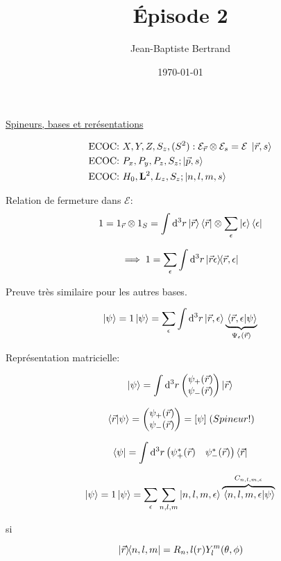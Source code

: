 \documentclass{article}
\title{Épisode 2}
\author{Jean-Baptiste Bertrand}
\date{\today}
\begin{document}
\maketitle

\underline{Spineurs, bases et rerésentations}

\begin{align}
	&\text{ECOC: } X, Y, Z, S_z, (S^2): \mathcal{E}_{\vec r}\otimes \mathcal{E}_s=\mathcal{E}\; \ket{\vec r, s}\\
	&\text{ECOC: } P_x, P_y, P_z, S_z; \ket{\vec p, s}\\
	&\text{ECOC: } H_0, \vb L^2, L_z, S_z ; \ket{n,l,m,s}
\end{align}

Relation de fermeture dans $\mathcal{E}:$ $$1 = 1_{\vec r} \otimes 1_S = \int \dd^3 r \ket{\vec r}\bra{\vec r} \otimes \sum_\epsilon \ket{\epsilon}\bra{\epsilon}$$

$$\implies 1 = \sum_\epsilon\int\dd^3r \ketbra*{\vec r\epsilon}{\vec r, \epsilon}$$

Preuve très similaire pour les autres bases.

$$\ket\psi = 1 \ket \psi = \sum_\epsilon \int \dd^3r \ket{\vec r, \epsilon} \underbrace{\braket*{\vec r, \epsilon}{\psi}}_{\Psi_\epsilon(\vec r)}$$

Représentation matricielle:

$$
	\ket\psi = \int \dd^3 r \begin{pmatrix}
		\psi_+(\vec r)\\
		\psi_-(\vec r)
	\end{pmatrix}\ket{\vec r}
$$

$$\braket*{\vec r}{\psi} = \begin{pmatrix}
	\psi_+(\vec r)\\
	\psi_-(\vec r) 
\end{pmatrix} = [\psi] \; \text(Spineur!)$$ 

$$
	\bra\psi = \int \dd^3 r \begin{pmatrix}
		\psi^*_+(\vec r) &
		\psi^*_-(\vec r)
	\end{pmatrix}\bra{\vec r}
$$


\begin{equation}
	\ket\psi = 1\ket\psi = \sum_\epsilon\sum_{n,l,m} \ket{n,l,m,\epsilon}\overbrace{\braket*{n,l,m,\epsilon}{\psi}}^{C_{n,l,m,\epsilon}}
\end{equation}

si

$$\ketbra*{\vec r}{n,l,m} = R_n,l(r)Y_l^m(\theta,\phi)$$
\end{document}

